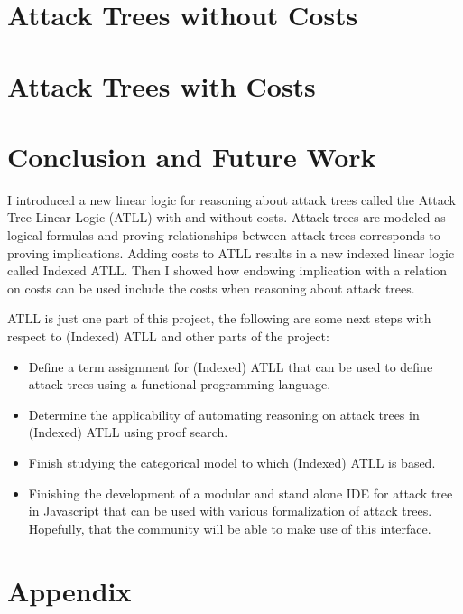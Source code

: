 \documentclass{llncs}
\begin{document}
\section{Attack Trees without Costs}
\label{sec:attack_trees_without_costs}


\section{Attack Trees with Costs}
\label{sec:attack_trees_with_costs}


\section{Conclusion and Future Work}
\label{sec:conclusion}
I introduced a new linear logic for reasoning about attack trees
called the Attack Tree Linear Logic (ATLL) with and without costs.
Attack trees are modeled as logical formulas and proving relationships
between attack trees corresponds to proving implications.  Adding
costs to ATLL results in a new indexed linear logic called Indexed
ATLL.  Then I showed how endowing implication with a relation on costs
can be used include the costs when reasoning about attack trees.

ATLL is just one part of this project, the following are some next
steps with respect to (Indexed) ATLL and other parts of the project:
\begin{itemize}
\item Define a term assignment for (Indexed) ATLL that can be used to
  define attack trees using a functional programming language.
\item Determine the applicability of automating reasoning on attack
  trees in (Indexed) ATLL using proof search.  
\item Finish studying the categorical model to which (Indexed) ATLL is
  based.
\item Finishing the development of a modular and stand alone IDE for
  attack tree in Javascript that can be used with various
  formalization of attack trees.  Hopefully, that the community will
  be able to make use of this interface.
\end{itemize}





\appendix

\section*{Appendix}
\label{sec:appendix}

\end{document}
